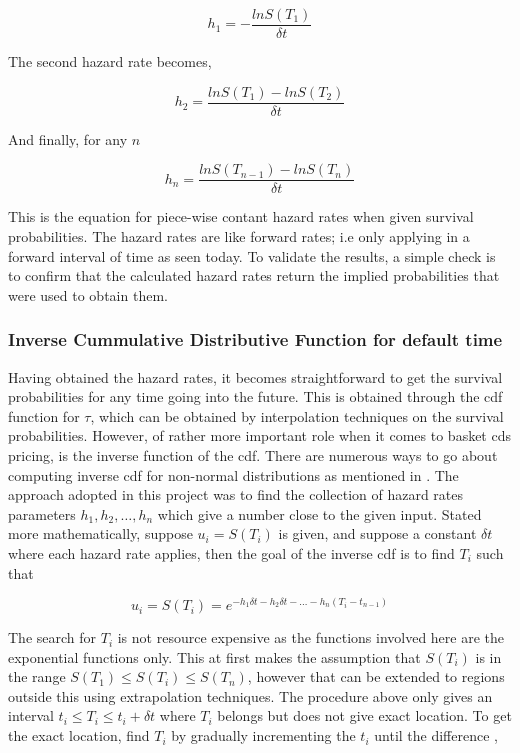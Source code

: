 \documentclass[a4paper,12pt]{article}
\begin{document}
$$h_1 = -\frac{lnS(T_1)}{\delta t} $$
 
The second hazard rate becomes, 

$$h_2 = \frac{lnS(T_1) - lnS(T_2)}{\delta t} $$

And finally, for any $n$ 

\begin{equation}
h_n = \frac{lnS(T_{n - 1}) - lnS(T_n)}{\delta t}
\end{equation}

This is the equation for piece-wise contant hazard rates when given survival probabilities. The hazard rates are like forward rates; i.e only applying in a forward interval of time as seen today. To validate the results, a simple check is to confirm that the calculated hazard rates return the implied probabilities that were used to obtain them. 

\subsubsection{Inverse Cummulative Distributive Function for default time}
Having obtained the hazard rates, it becomes straightforward to get the survival probabilities for any time going into the future. This is obtained through the cdf function for $\tau$, which can be obtained by interpolation techniques on the survival probabilities. However, of rather more important role when it comes to basket cds pricing, is the inverse function of the cdf. There are numerous ways to go about computing inverse cdf for non-normal distributions as mentioned in \cite{peter_jackel}. The approach adopted in this project was to find the collection of hazard rates parameters $h_1, h_2, \dots , h_n$ which give a number close to the given input. Stated more mathematically, suppose $u_i = S(T_i)$ is given, and suppose a constant $\delta t$ where each hazard rate applies, then the goal of the inverse cdf is to find $T_i$ such that 

$$u_i = S(T_i) = e^{-h_1\delta t - h_2 \delta t - \dots - h_n(T_i - t_{n - 1})} $$

The search for $T_i$ is not resource expensive as the functions involved here are the exponential functions only. This at first makes the assumption that $S(T_i)$ is in the range $S(T_1) \leq S(T_i) \leq S(T_n)$, however that can be extended to regions outside this using extrapolation techniques. The procedure above only gives an interval $t_i \leq T_i \leq t_i + \delta t$ where $T_i$ belongs but does not give exact location. To get the exact location, find $T_i$ by gradually incrementing the $t_i$ until the difference , 
\end{document}
